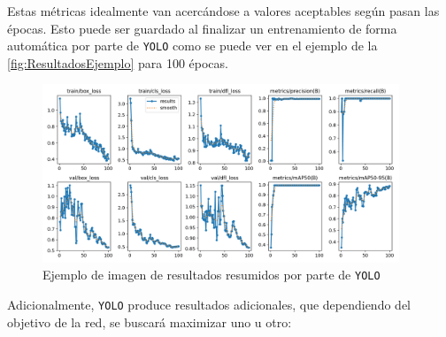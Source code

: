 Estas métricas idealmente van acercándose a valores aceptables según pasan las épocas. Esto puede ser guardado al finalizar un entrenamiento de forma automática por parte de \texttt{YOLO} como se puede ver en el 
ejemplo de la \autoref{fig:ResultadosEjemplo} para 100 épocas.

\begin{figure}[H]
    \centering
    \includegraphics[width=0.95\textwidth]{images/13/a/results.png}
    \caption{Ejemplo de imagen de resultados resumidos por parte de \texttt{YOLO}}
    \label{fig:ResultadosEjemplo}
\end{figure}
\clearpage
Adicionalmente, \texttt{YOLO} produce resultados adicionales, que dependiendo del objetivo de la red, se buscará maximizar uno u otro:

